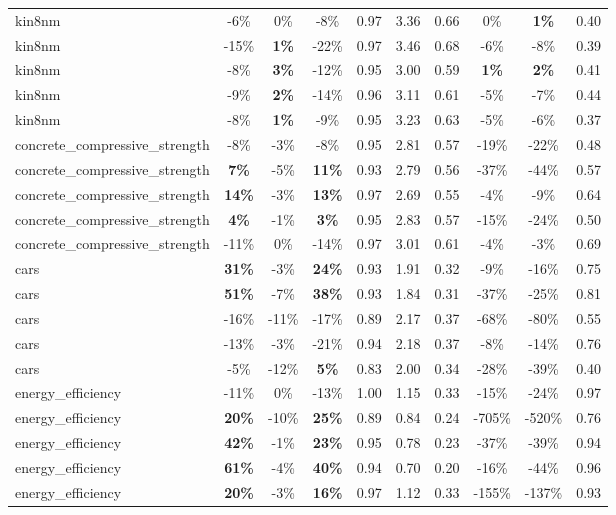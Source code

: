 \begin{table}[!htbp]
\begin{small}
\begin{sc}
{\begin{tabular}{lccccccccc}
kin8nm & -6\% & 0\% & -8\% & 0.97 & 3.36 & 0.66 & 0\% & \textbf{1\%} & 0.40 \\
kin8nm & -15\% & \textbf{1\%} & -22\% & 0.97 & 3.46 & 0.68 & -6\% & -8\% & 0.39 \\
kin8nm & -8\% & \textbf{3\%} & -12\% & 0.95 & 3.00 & 0.59 & \textbf{1\%} & \textbf{2\%} & 0.41 \\
kin8nm & -9\% & \textbf{2\%} & -14\% & 0.96 & 3.11 & 0.61 & -5\% & -7\% & 0.44 \\
kin8nm & -8\% & \textbf{1\%} & -9\% & 0.95 & 3.23 & 0.63 & -5\% & -6\% & 0.37 \\
concrete\_compressive\_strength & -8\% & -3\% & -8\% & 0.95 & 2.81 & 0.57 & -19\% & -22\% & 0.48 \\
concrete\_compressive\_strength & \textbf{7\%} & -5\% & \textbf{11\%} & 0.93 & 2.79 & 0.56 & -37\% & -44\% & 0.57 \\
concrete\_compressive\_strength & \textbf{14\%} & -3\% & \textbf{13\%} & 0.97 & 2.69 & 0.55 & -4\% & -9\% & 0.64 \\
concrete\_compressive\_strength & \textbf{4\%} & -1\% & \textbf{3\%} & 0.95 & 2.83 & 0.57 & -15\% & -24\% & 0.50 \\
concrete\_compressive\_strength & -11\% & 0\% & -14\% & 0.97 & 3.01 & 0.61 & -4\% & -3\% & 0.69 \\
cars & \textbf{31\%} & -3\% & \textbf{24\%} & 0.93 & 1.91 & 0.32 & -9\% & -16\% & 0.75 \\
cars & \textbf{51\%} & -7\% & \textbf{38\%} & 0.93 & 1.84 & 0.31 & -37\% & -25\% & 0.81 \\
cars & -16\% & -11\% & -17\% & 0.89 & 2.17 & 0.37 & -68\% & -80\% & 0.55 \\
cars & -13\% & -3\% & -21\% & 0.94 & 2.18 & 0.37 & -8\% & -14\% & 0.76 \\
cars & -5\% & -12\% & \textbf{5\%} & 0.83 & 2.00 & 0.34 & -28\% & -39\% & 0.40 \\
energy\_efficiency & -11\% & 0\% & -13\% & 1.00 & 1.15 & 0.33 & -15\% & -24\% & 0.97 \\
energy\_efficiency & \textbf{20\%} & -10\% & \textbf{25\%} & 0.89 & 0.84 & 0.24 & -705\% & -520\% & 0.76 \\
energy\_efficiency & \textbf{42\%} & -1\% & \textbf{23\%} & 0.95 & 0.78 & 0.23 & -37\% & -39\% & 0.94 \\
energy\_efficiency & \textbf{61\%} & -4\% & \textbf{40\%} & 0.94 & 0.70 & 0.20 & -16\% & -44\% & 0.96 \\
energy\_efficiency & \textbf{20\%} & -3\% & \textbf{16\%} & 0.97 & 1.12 & 0.33 & -155\% & -137\% & 0.93 \\

\end{tabular}}
\end{sc}
\end{small}
\end{table}
